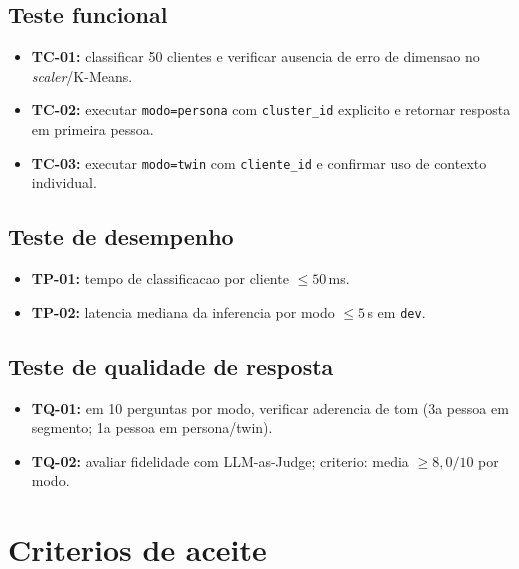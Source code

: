 \subsection{Teste funcional}

\begin{itemize}[leftmargin=*]
  \item \textbf{TC-01:} classificar 50 clientes e verificar ausencia de erro
        de dimensao no \textit{scaler}/K-Means.
  \item \textbf{TC-02:} executar \texttt{modo=persona} com \texttt{cluster\_id}
        explicito e retornar resposta em primeira pessoa.
  \item \textbf{TC-03:} executar \texttt{modo=twin} com \texttt{cliente\_id}
        e confirmar uso de contexto individual.
\end{itemize}

\subsection{Teste de desempenho}

\begin{itemize}[leftmargin=*]
  \item \textbf{TP-01:} tempo de classificacao por cliente $\leq 50$\,ms.
  \item \textbf{TP-02:} latencia mediana da inferencia por modo
        $\leq 5$\,s em \texttt{dev}.
\end{itemize}

\subsection{Teste de qualidade de resposta}

\begin{itemize}[leftmargin=*]
  \item \textbf{TQ-01:} em 10 perguntas por modo, verificar aderencia de tom
        (3a pessoa em segmento; 1a pessoa em persona/twin).
  \item \textbf{TQ-02:} avaliar fidelidade com LLM-as-Judge;
        criterio: media $\geq 8{,}0/10$ por modo.
\end{itemize}

\section{Criterios de aceite}

